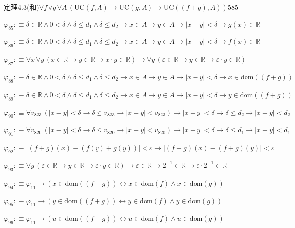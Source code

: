 \begin{fullproof}{定理4.3(和)}{$\forall f\,\forall g\,\forall A\,(\mathrm{UC}(f,A) \to \mathrm{UC}(g,A) \to \mathrm{UC}((f + g),A))$}{585}
\begin{abbrevlist}
\item $\varphi_{85} :\equiv \delta \in \mathbb{R} \land 0 < \delta \land \delta \leq d_{1} \land \delta \leq d_{2} \to x \in A \to y \in A \to \lvert x - y \rvert < \delta \to g(x) \in \mathbb{R}$
\item $\varphi_{86} :\equiv \delta \in \mathbb{R} \land 0 < \delta \land \delta \leq d_{1} \land \delta \leq d_{2} \to x \in A \to y \in A \to \lvert x - y \rvert < \delta \to f(x) \in \mathbb{R}$
\item $\varphi_{87} :\equiv \forall x\,\forall y\,(x \in \mathbb{R} \to y \in \mathbb{R} \to x \cdot y \in \mathbb{R}) \to \forall y\,(\varepsilon \in \mathbb{R} \to y \in \mathbb{R} \to \varepsilon \cdot y \in \mathbb{R})$
\item $\varphi_{88} :\equiv \delta \in \mathbb{R} \land 0 < \delta \land \delta \leq d_{1} \land \delta \leq d_{2} \to x \in A \to y \in A \to \lvert x - y \rvert < \delta \to x \in \mathrm{dom}((f + g))$
\item $\varphi_{89} :\equiv \delta \in \mathbb{R} \land 0 < \delta \land \delta \leq d_{1} \land \delta \leq d_{2} \to x \in A \to y \in A \to \lvert x - y \rvert < \delta \to y \in \mathrm{dom}((f + g))$
\item $\varphi_{90} :\equiv \forall v_{823}\,(\lvert x - y \rvert < \delta \to \delta \leq v_{823} \to \lvert x - y \rvert < v_{823}) \to \lvert x - y \rvert < \delta \to \delta \leq d_{2} \to \lvert x - y \rvert < d_{2}$
\item $\varphi_{91} :\equiv \forall v_{820}\,(\lvert x - y \rvert < \delta \to \delta \leq v_{820} \to \lvert x - y \rvert < v_{820}) \to \lvert x - y \rvert < \delta \to \delta \leq d_{1} \to \lvert x - y \rvert < d_{1}$
\item $\varphi_{92} :\equiv \lvert (f + g)(x) - (f(y) + g(y)) \rvert < \varepsilon \to \lvert (f + g)(x) - (f + g)(y) \rvert < \varepsilon$
\item $\varphi_{93} :\equiv \forall y\,(\varepsilon \in \mathbb{R} \to y \in \mathbb{R} \to \varepsilon \cdot y \in \mathbb{R}) \to \varepsilon \in \mathbb{R} \to 2^{-1} \in \mathbb{R} \to \varepsilon \cdot 2^{-1} \in \mathbb{R}$
\item $\varphi_{94} :\equiv \varphi_{11} \to (x \in \mathrm{dom}((f + g)) \leftrightarrow x \in \mathrm{dom}(f) \land x \in \mathrm{dom}(g))$
\item $\varphi_{95} :\equiv \varphi_{11} \to (y \in \mathrm{dom}((f + g)) \leftrightarrow y \in \mathrm{dom}(f) \land y \in \mathrm{dom}(g))$
\item $\varphi_{96} :\equiv \varphi_{11} \to (u \in \mathrm{dom}((f + g)) \leftrightarrow u \in \mathrm{dom}(f) \land u \in \mathrm{dom}(g))$

\end{abbrevlist}
\end{fullproof}
